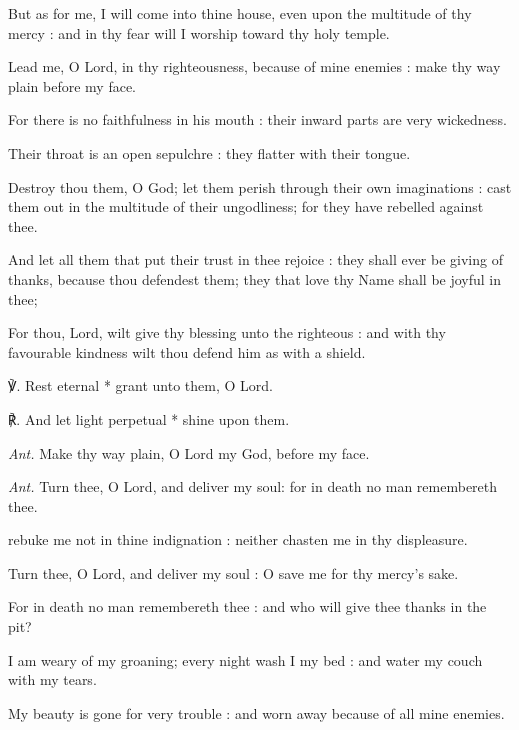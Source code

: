 But as for me, I will come into thine house, even upon the multitude of thy mercy : and in thy fear will I worship toward thy holy temple.\par
{}Lead me, O Lord, in thy righteousness, because of mine enemies : make thy way plain before my face.\par
{}For there is no faithfulness in his mouth : their inward parts are very wickedness.\par
{}Their throat is an open sepulchre : they flatter with their tongue.\par
{}Destroy thou them, O God; let them perish through their own imaginations : cast them out in the multitude of their ungodliness; for they have rebelled against thee.\par
{}And let all them that put their trust in thee rejoice : they shall ever be giving of thanks, because thou defendest them; they that love thy Name shall be joyful in thee;\par
{}For thou, Lord, wilt give thy blessing unto the righteous : and with thy favourable kindness wilt thou defend him as with a shield.\par
℣. Rest eternal * grant unto them, O Lord.\par
℟. And let light perpetual * shine upon them.\par\noindent
\textit{Ant.} Make thy way plain, O Lord my God, before my face.\par
{}\par\noindent
\textit{Ant.} Turn thee, {\dag} O Lord, and deliver my soul: for in death no man remembereth thee.\par
{} rebuke me not in thine indignation : neither chasten me in thy displeasure.\par
{}
Turn thee, O Lord, and deliver my soul : O save me for thy mercy's sake.\par
{}For in death no man remembereth thee : and who will give thee thanks in the pit?\par
{}I am weary of my groaning; every night wash I my bed : and water my couch with my tears.\par
{}My beauty is gone for very trouble : and worn away because of all mine enemies.\par

